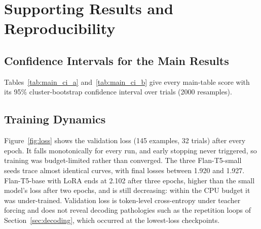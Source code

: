
\chapter{Supporting Results and Reproducibility} %
\label{AppendixA}

\section{Confidence Intervals for the Main Results}

Tables~\ref{tab:main_ci_a} and~\ref{tab:main_ci_b} give every main-table score with its 95\% cluster-bootstrap confidence interval over trials (2000 resamples).

\begin{table}[htbp]
    \centering
    \small
    \caption[Main results with CIs: ROUGE]{ROUGE scores with 95\% trial-level CIs (test set, main protocol).}
    \label{tab:main_ci_a}
\end{table}

\begin{table}[htbp]
    \centering
    \small
    \caption[Main results with CIs: BLEU, token F1, BERTScore]{BLEU, token F1 and BERTScore with 95\% trial-level CIs (test set, main protocol). BERTScore is baseline-rescaled.}
    \label{tab:main_ci_b}
\end{table}

\section{Training Dynamics}
\label{sec:training}

Figure~\ref{fig:loss} shows the validation loss (145 examples, 32 trials) after every epoch. It falls monotonically for every run, and early stopping never triggered, so training was budget-limited rather than converged. The three Flan-T5-small seeds trace almost identical curves, with final losses between 1.920 and 1.927. Flan-T5-base with LoRA ends at 2.102 after three epochs, higher than the small model's loss after two epochs, and is still decreasing: within the CPU budget it was under-trained. Validation loss is token-level cross-entropy under teacher forcing and does not reveal decoding pathologies such as the repetition loops of Section~\ref{sec:decoding}, which occurred at the lowest-loss checkpoints.

